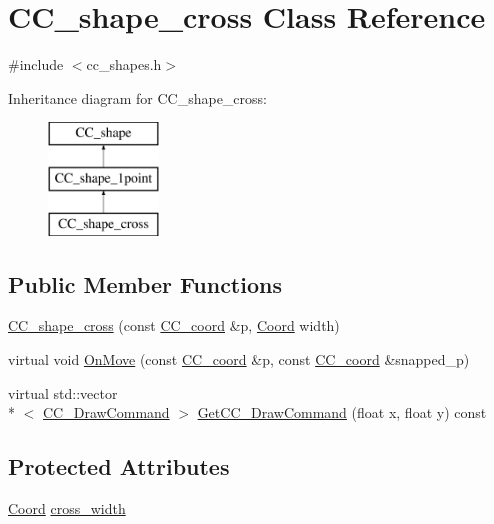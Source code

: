\hypertarget{a00042}{\section{C\-C\-\_\-shape\-\_\-cross Class Reference}
\label{a00042}
}


{\ttfamily \#include $<$cc\-\_\-shapes.\-h$>$}

Inheritance diagram for C\-C\-\_\-shape\-\_\-cross\-:\begin{figure}[H]
\begin{center}
\leavevmode
\includegraphics[height=3.000000cm]{a00042}
\end{center}
\end{figure}
\subsection*{Public Member Functions}
\begin{DoxyCompactItemize}
\item 
\hyperlink{a00042_a57daadb08b97a07f60da56af4b623cd1}{C\-C\-\_\-shape\-\_\-cross} (const \hyperlink{a00029}{C\-C\-\_\-coord} \&p, \hyperlink{a00216_acd9dae57b712df0e2d3588c0c4798c11}{Coord} width)
\item 
virtual void \hyperlink{a00042_a3326faef7625f5edfad2e5ba09927b6d}{On\-Move} (const \hyperlink{a00029}{C\-C\-\_\-coord} \&p, const \hyperlink{a00029}{C\-C\-\_\-coord} \&snapped\-\_\-p)
\item 
virtual std\-::vector\\*
$<$ \hyperlink{a00031}{C\-C\-\_\-\-Draw\-Command} $>$ \hyperlink{a00042_ad258d1e056279b8e1b37cc25ac286ed8}{Get\-C\-C\-\_\-\-Draw\-Command} (float x, float y) const 
\end{DoxyCompactItemize}
\subsection*{Protected Attributes}
\begin{DoxyCompactItemize}
\item 
\hyperlink{a00216_acd9dae57b712df0e2d3588c0c4798c11}{Coord} \hyperlink{a00042_a8e702535e5089fed5c19c2c7bb20d74f}{cross\-\_\-width}
\end{DoxyCompactItemize}


